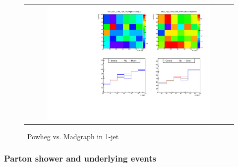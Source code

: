 \begin{figure}[htp]
\centering
\begin{tabular}{c}
\includegraphics[width=0.8\textwidth]{figures/histo_Top_CMS_hww_MVATopBounding_1j_zoom.pdf}
\end{tabular}
\caption{ \topbkg\ Powheg vs. Madgraph in 1-jet}
\label{fig:alter_top}
\end{figure}

\subsubsection{Parton shower and underlying events}

